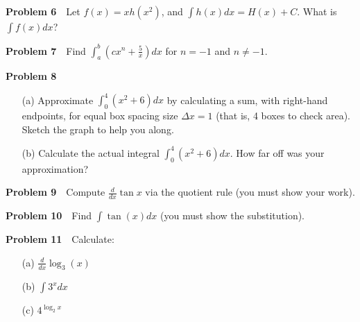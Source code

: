 \documentclass[10pt]{article}
\begin{document}
\vspace{5mm}

\noindent\textbf{Problem 6} \,\, Let $f(x) = x h(x^2)$, and $\int h(x) dx = H(x) + C$. What is $\int f(x) dx$?

\vspace{5mm}

\noindent\textbf{Problem 7} \,\, Find $\int_a^b (c x^n + \frac{5}{x}) dx$ for $n=-1$ and $n \neq -1$.

\vspace{5mm}

\noindent\textbf{Problem 8} \,\, 
\begin{itemize}
\item[(a) ] Approximate $\int_{0}^{4} (x^2 + 6) dx$ by calculating a sum, with right-hand endpoints, for equal box spacing size $\Delta x = 1$ (that is, 4 boxes to check area). Sketch the graph to help you along. 
\item[(b) ] Calculate the actual integral $\int_{0}^{4} (x^2 + 6) dx$. How far off was your approximation?
\end{itemize}

\vspace{5mm}

\noindent\textbf{Problem 9} \,\, Compute $\frac{d}{dx} \tan x$ via the quotient rule (you must show your work).

\vspace{5mm}

\noindent\textbf{Problem 10} \,\, Find $\int \tan(x) dx$ (you must show the substitution). 

\vspace{5mm}

\noindent\textbf{Problem 11} \,\, Calculate:
\begin{itemize}
\item[(a) ] $\frac{d}{dx} \log_{3}(x)$
\item[(b) ] $\int 3^x dx$
\item[(c) ] $4^{\log_2 x}$
\end{itemize}
\end{document}
